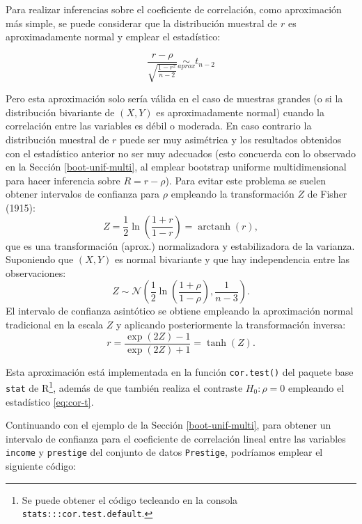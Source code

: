 \documentclass[
]{book}
\newenvironment{Shaded}{\begin{snugshade}}{\end{snugshade}}
\newcommand{\CommentTok}[1]{\textcolor[rgb]{0.56,0.35,0.01}{\textit{#1}}}
\newcommand{\DataTypeTok}[1]{\textcolor[rgb]{0.13,0.29,0.53}{#1}}
\newcommand{\KeywordTok}[1]{\textcolor[rgb]{0.13,0.29,0.53}{\textbf{#1}}}
\newcommand{\NormalTok}[1]{#1}
\newcommand{\OperatorTok}[1]{\textcolor[rgb]{0.81,0.36,0.00}{\textbf{#1}}}
\newcommand{\StringTok}[1]{\textcolor[rgb]{0.31,0.60,0.02}{#1}}
\theoremstyle{break}
\theoremstyle{definition}
\theoremstyle{definition}
\theoremstyle{definition}
\theoremstyle{remark}
\begin{document}
Para realizar inferencias sobre el coeficiente de correlación, como aproximación más simple, se puede considerar que la distribución muestral de \(r\) es aproximadamente normal y emplear el estadístico:

\begin{equation} 
\frac{r -\rho}{\sqrt{\frac{1 - r^2}{n - 2}}} \underset{aprox}{\sim } t_{n-2}
\label{eq:cor-t}
\end{equation}

Pero esta aproximación solo sería válida en el caso de muestras grandes (o si la distribución bivariante de \((X, Y)\) es aproximadamente normal) cuando la correlación entre las variables es débil o moderada.
En caso contrario la distribución muestral de \(r\) puede ser muy asimétrica y los resultados obtenidos con el estadístico anterior no ser muy adecuados (esto concuerda con lo observado en la Sección \ref{boot-unif-multi}, al emplear bootstrap uniforme multidimensional para hacer inferencia sobre \(R = r -\rho\)).
Para evitar este problema se suelen obtener intervalos de confianza para \(\rho\) empleando la transformación \(Z\) de Fisher (1915):
\[Z = \frac{1}{2}\ln \left( \frac{1+r}{1-r} \right) = \operatorname{arctanh}(r),\]
que es una transformación (aprox.) normalizadora y estabilizadora de la varianza.
Suponiendo que \((X, Y)\) es normal bivariante y que hay independencia entre las observaciones:
\[Z \sim \mathcal{N}\left( \frac{1}{2}\ln \left( \frac{1+\rho}{1-\rho} \right), \frac{1}{n-3} \right).\]
El intervalo de confianza asintótico se obtiene empleando la aproximación normal tradicional en la escala \(Z\) y aplicando posteriormente la transformación inversa:
\[r = \frac{\exp(2Z)-1}{\exp(2Z)+1} = \operatorname{tanh}(Z).\]

Esta aproximación está implementada en la función \texttt{cor.test()} del paquete base \texttt{stat} de R\footnote{Se puede obtener el código tecleando en la consola \texttt{stats:::cor.test.default}.}, además de que también realiza el contraste \(H_0: \rho = 0\) empleando el estadístico \eqref{eq:cor-t}.

Continuando con el ejemplo de la Sección \ref{boot-unif-multi}, para obtener un intervalo de confianza para el coeficiente de correlación lineal entre las variables \texttt{income} y \texttt{prestige} del conjunto de datos \texttt{Prestige}, podríamos emplear el siguiente código:

\begin{Shaded}
\end{Shaded}
\end{document}
